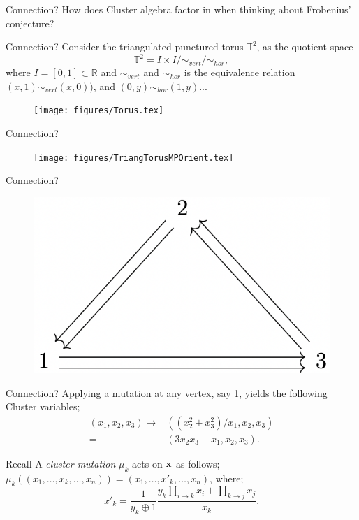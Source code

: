 \documentclass{beamer}
\begin{document}
\begin{frame}{Connection?}
\centering
    How does Cluster algebra factor in when thinking about Frobenius' conjecture?
\end{frame}

\begin{frame}{Connection?}
    Consider the triangulated punctured torus $\mathbb{T}^2$, as the quotient space
    \begin{equation*}
        \mathbb{T}^2 = I \times I/\sim_{vert}/\sim_{hor}, 
    \end{equation*}
    where $I = [0,1] \subset \mathbb{R}$ and $\sim_{vert}$ and $\sim_{hor}$ is the equivalence relation $(x,1)\sim_{vert}(x,0))$, and $(0,y)\sim_{hor}(1,y)$...
    \pause
    \begin{figure}
        \centering
        \texttt{[image: figures/Torus.tex]}
    \end{figure}
\end{frame}

\begin{frame}{Connection?}
\begin{figure}
    \centering\texttt{[image: figures/TriangTorusMPOrient.tex]}
\end{figure}    
\end{frame}

\begin{frame}{Connection?}
\begin{figure}
    \centering
    \includegraphics[width = 5 cm
]{Images/MarkovQuiverImgPres.png}
\end{figure}
\end{frame}
\begin{frame}{Connection?}
    Applying a mutation at any vertex, say 1, yields the following Cluster variables; \pause
    \begin{align*}
        (x_1,x_2,x_3) \mapsto &((x_2^2 + x^2_3)/x_1, x_2,x_3) \\
        =&(3x_2x_3 - x_1,x_2,x_3).
    \end{align*} \pause
    \begin{alertblock}{Recall}
        A \emph{cluster mutation} $\mu_k$ acts on $\bold{x}$ as follows; $\mu_k((x_1,\dots,x_k,\dots, x_n)) = (x_1,\dots,x'_k,\dots,x_n)$, where; \pause
\begin{equation*}
    x'_k = \dfrac{1}{y_k \oplus 1}\dfrac{y_k\prod_{i \to k}x_i + \prod_{k \to j}x_j}{x_k}.
\end{equation*}
    \end{alertblock}
\end{frame}
\end{document}
